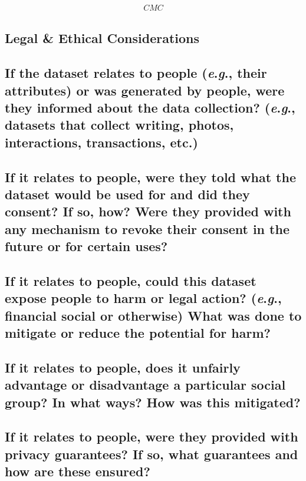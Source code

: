 \documentclass[a4paper,9pt]{extarticle}
\newcommand{\eg}{\textit{e}.\textit{g}., }
\begin{document}
\begin{align*}
CMC
\end{align*}



\newpage

\begin{multicols}{2}

\newpage



\section*{Legal \& Ethical Considerations}
\subsection*{If the dataset relates to people (\eg their attributes) or was generated by people, were they informed about the data collection? (\eg datasets that collect writing, photos, interactions, transactions, etc.)}
\noindent


\subsection*{If it relates to people, were they told what the dataset would be used for and did they consent? If so, how? Were they provided with any mechanism to revoke their consent in the future or for certain uses?}
\noindent

\subsection*{If it relates to people, could this dataset expose people to harm or legal action? (\eg financial social or otherwise) What was done to mitigate or reduce the potential for harm?}
\noindent

\subsection*{If it relates to people, does it unfairly advantage or disadvantage a particular social group? In what ways? How was this mitigated?}
\noindent

\subsection*{If it relates to people, were they provided with privacy guarantees? If so, what guarantees and how are these ensured?}
\noindent


\end{multicols}
\end{document}
